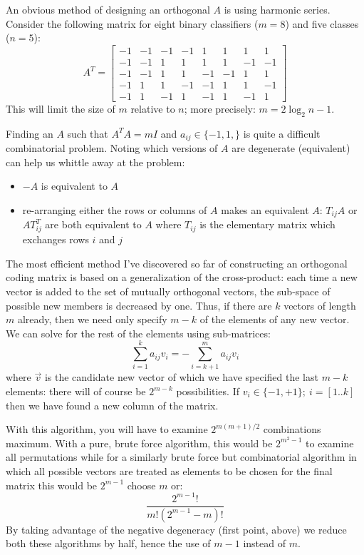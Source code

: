 An obvious method of designing an orthogonal $A$ is using harmonic series.
Consider the following matrix for eight binary classifiers ($m=8$) and
five classes ($n=5$):
\begin{equation}
	A^T = \left [ \begin{array}{rrrrrrrr}
			-1 & -1 & -1 & -1 & 1 & 1 & 1 & 1 \\
			-1 & -1 & 1 & 1 & 1 & 1 & -1 & -1 \\
			-1 & -1 & 1 & 1 & -1 & -1 & 1 & 1 \\
			-1 & 1 & 1 & -1 & -1 & 1 & 1 & -1 \\
			-1 & 1 & -1 & 1 & -1 & 1 & -1 & 1
	\end{array} \right ]
\end{equation}
This will limit the size of $m$ relative to $n$; more precisely:
$m=2 \log_2 n - 1$.

Finding an $A$ such that $A^T A = m I$ and $a_{ij} \in \lbrace -1, 1, \rbrace$
is quite a difficult combinatorial problem.
Noting which versions of $A$ are degenerate (equivalent) can help us whittle
away at the problem:
\begin{itemize}
	\item $-A$ is equivalent to $A$
	\item re-arranging either the rows or columns of $A$ makes an equivalent $A$: $T_{ij} A$ or $A T_{ij}^T$ are both equivalent to $A$ where $T_{ij}$ is the elementary matrix which exchanges rows $i$ and $j$
\end{itemize}

The most efficient method I've discovered so far of constructing an orthogonal
coding matrix is based on a generalization of the cross-product:
each time a new vector is added to the set of mutually orthogonal vectors, 
the sub-space of possible new members is decreased by one.
Thus, if there are $k$ vectors of length $m$ already, then we need only specify $m-k$
of the elements of any new vector.
We can solve for the rest of the elements using sub-matrices:
\begin{equation}
	\sum_{i=1}^{k} a_{ij} v_i = - \sum_{i=k+1}^m a_{ij} v_i
\end{equation}
where $\vec v$ is the candidate new vector of which we have specified the last
$m-k$ elements: there will of course be $2^{m-k}$ possibilities.
If $v_i \in \lbrace -1, +1 \rbrace;~i=[1..k]$ then we have found a new 
column of the matrix.

With this algorithm, you will have to examine $2^{m(m+1)/2}$ combinations
maximum.
With a pure, brute force algorithm, this would be $2^{m^2-1}$ to examine all
permutations while for a similarly brute force but combinatorial algorithm 
in which all possible vectors are treated as elements to be chosen for the 
final matrix this would be $2^{m-1}$ choose $m$ or:
\begin{equation}
	\frac{2^{m-1}!}{m!(2^{m-1}-m)!}
\end{equation}
By taking advantage of the negative degeneracy (first point, above) 
we reduce both these algorithms by half, hence the use of $m-1$ instead of $m$.

